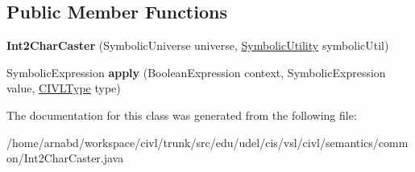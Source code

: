 \subsection*{Public Member Functions}
\begin{DoxyCompactItemize}
\item 
\hypertarget{classedu_1_1udel_1_1cis_1_1vsl_1_1civl_1_1semantics_1_1common_1_1Int2CharCaster_aa1e6ba7bab36aab4a842d8be037d5376}{}{\bfseries Int2\+Char\+Caster} (Symbolic\+Universe universe, \hyperlink{interfaceedu_1_1udel_1_1cis_1_1vsl_1_1civl_1_1dynamic_1_1IF_1_1SymbolicUtility}{Symbolic\+Utility} symbolic\+Util)\label{classedu_1_1udel_1_1cis_1_1vsl_1_1civl_1_1semantics_1_1common_1_1Int2CharCaster_aa1e6ba7bab36aab4a842d8be037d5376}

\item 
\hypertarget{classedu_1_1udel_1_1cis_1_1vsl_1_1civl_1_1semantics_1_1common_1_1Int2CharCaster_a4d07fdbfd8906249f276ecb4abf6ba3c}{}Symbolic\+Expression {\bfseries apply} (Boolean\+Expression context, Symbolic\+Expression value, \hyperlink{interfaceedu_1_1udel_1_1cis_1_1vsl_1_1civl_1_1model_1_1IF_1_1type_1_1CIVLType}{C\+I\+V\+L\+Type} type)\label{classedu_1_1udel_1_1cis_1_1vsl_1_1civl_1_1semantics_1_1common_1_1Int2CharCaster_a4d07fdbfd8906249f276ecb4abf6ba3c}

\end{DoxyCompactItemize}


The documentation for this class was generated from the following file\+:\begin{DoxyCompactItemize}
\item 
/home/arnabd/workspace/civl/trunk/src/edu/udel/cis/vsl/civl/semantics/common/Int2\+Char\+Caster.\+java\end{DoxyCompactItemize}
